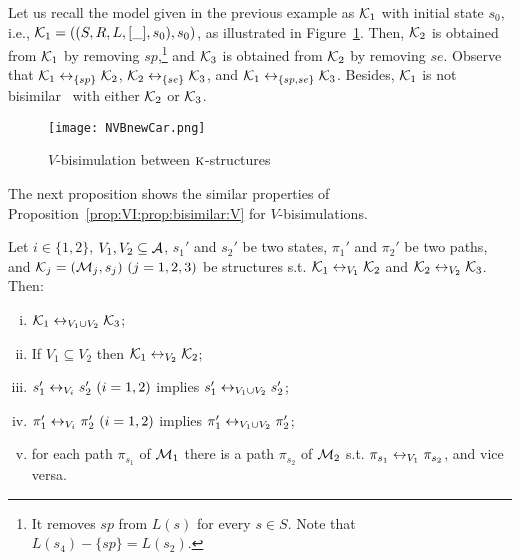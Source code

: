 \documentclass[twoside,11pt]{article}
\begin{document}
\begin{example}
	\label{ex:2}
	Let us recall the model given in the previous example as ${\cal K}_1$ with initial state $s_0$, i.e., ${\cal K}_1=((S,R,L,[\_],s_0),s_0)$, as illustrated in Figure~\ref{v1uv2}. Then, ${\cal K}_2$ is obtained from ${\cal K}_1$ by  removing  $sp$,\footnote{It removes $sp$ from $L(s)$ for every $s\in S$. Note that $L(s_4)-\{sp\}=L(s_2)$.} and  ${\cal K}_3$ is obtained from ${\cal K}_2$ by removing $se$.
	Observe that ${\cal K}_1\leftrightarrow_{\{sp\}} {\cal K}_2$, ${\cal K}_2\leftrightarrow_{\{se\}} {\cal K}_3$, and ${\cal K}_1\leftrightarrow_{\{sp,se\}} {\cal K}_3$. Besides,  ${\cal K}_1$ is not bisimilar~\cite{Baier:PMC:2008} with either ${\cal K}_2$ or ${\cal K}_3$.
	\begin{figure*}[!htb]
		\centering
		\texttt{[image: NVBnewCar.png]}\\
		\caption{$V$-bisimulation between $\textsc{k}$-structures}\label{v1uv2}
	\end{figure*}
\end{example}




The next proposition shows the similar properties of Proposition~\ref{prop:VI:prop:bisimilar:V} for $V$-bisimulations.

\begin{proposition}\label{prop:bisimilar:V}
	Let $i\in \{1,2\}$, $V_1,V_2\subseteq\cal A$, $s_1'$ and $s_2'$ be two states,
	$\pi_1'$ and $\pi_2'$ be two paths,
	and ${\cal K}_j=({\cal M}_j,s_j)~(j=1,2,3)$ be structures
	s.t.
	${\cal K}_1\leftrightarrow_{V_1}{\cal K}_2$ and ${\cal K}_2\leftrightarrow_{V_2}{\cal K}_3$.
	Then:
	\begin{enumerate}[(i)]
		\item ${\cal K}_1\leftrightarrow_{V_1\cup V_2}{\cal K}_3$;
		\item If $V_1 \subseteq V_2$ then ${\cal K}_1 \leftrightarrow_{V_2} {\cal K}_2$;
		\item $s_1'\leftrightarrow_{V_i}s_2'~(i=1,2)$ implies $s_1'\leftrightarrow_{V_1\cup V_2}s_2'$;
		\item $\pi_1'\leftrightarrow_{V_i}\pi_2'~(i=1,2)$ implies $\pi_1'\leftrightarrow_{V_1\cup V_2}\pi_2'$;
		\item for each path $\pi_{s_1}$ of ${\cal M}_1$ there is a path $\pi_{s_2}$  of ${\cal M}_2$ s.t. $\pi_{s_1} \leftrightarrow_{V_1} \pi_{s_2}$, and vice versa.
	\end{enumerate}
\end{proposition}
\end{document}
